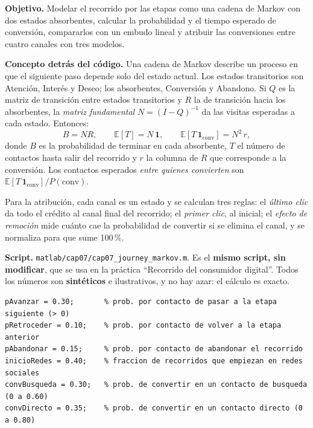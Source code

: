 \begin{cajaLaboratorio}
\textbf{Objetivo.} Modelar el recorrido por las etapas como una cadena de
Markov con dos estados absorbentes, calcular la probabilidad y el tiempo
esperado de conversión, compararlos con un embudo lineal y atribuir las
conversiones entre cuatro canales con tres modelos.

\textbf{Concepto detrás del código.} Una cadena de Markov describe un proceso
en que el siguiente paso depende solo del estado actual. Los estados
transitorios son Atención, Interés y Deseo; los absorbentes, Conversión y
Abandono. Si $Q$ es la matriz de transición entre estados transitorios y $R$
la de transición hacia los absorbentes, la \emph{matriz fundamental}
$N=(I-Q)^{-1}$ da las visitas esperadas a cada estado. Entonces:
\[
  B = N R, \qquad \mathbb{E}[T] = N\,\mathbf{1}, \qquad \mathbb{E}[T\,\mathbf{1}_{\text{conv}}] = N^{2}\,r,
\]
donde $B$ es la probabilidad de terminar en cada absorbente, $T$ el número de
contactos hasta salir del recorrido y $r$ la columna de $R$ que corresponde a
la conversión. Los contactos esperados \emph{entre quienes convierten} son
$\mathbb{E}[T\,\mathbf{1}_{\text{conv}}]/P(\text{conv})$.

Para la atribución, cada canal es un estado y se calculan tres reglas: el
\emph{último clic} da todo el crédito al canal final del recorrido; el
\emph{primer clic}, al inicial; el \emph{efecto de remoción}
\parencite{anderl2016} mide cuánto cae la probabilidad de convertir si se
elimina el canal, y se normaliza para que sume 100\,\%.

\textbf{Script.} \texttt{matlab/cap07/cap07\_journey\_markov.m}. Es el
\textbf{mismo script, sin modificar}, que se usa en la práctica
\enquote{Recorrido del consumidor digital}. Todos los números son
\textbf{sintéticos} e ilustrativos, y no hay azar: el cálculo es exacto.

\begin{lstlisting}[style=MATLABStyle, caption={Bloque de parámetros editable (\texttt{cap07\_journey\_markov.m}) — es lo único que cambia entre corridas.}]
pAvanzar = 0.30;       % prob. por contacto de pasar a la etapa siguiente (> 0)
pRetroceder = 0.10;    % prob. por contacto de volver a la etapa anterior
pAbandonar = 0.15;     % prob. por contacto de abandonar el recorrido
inicioRedes = 0.40;    % fraccion de recorridos que empiezan en redes sociales
convBusqueda = 0.30;   % prob. de convertir en un contacto de busqueda (0 a 0.60)
convDirecto = 0.35;    % prob. de convertir en un contacto directo (0 a 0.80)
\end{lstlisting}


\end{cajaLaboratorio}
